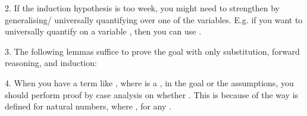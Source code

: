 \begin{isabellebody}
\begin{isamarkuptext}
  2. If the induction hypothesis is too week, you might need to strengthen by generalising/
     universally quantifying over one of the variables. E.g. if you want to universally quantify on
     a variable , then you can use .

  3. The following lemmas suffice to prove the goal with only substitution, forward reasoning, and
     induction:


  4. When you have a term like , where  is a , in the goal or the assumptions, you 
     should perform proof by case analysis on whether . This is because of the way \isa{{\isacharminus}{\kern0pt}} is
     defined for natural numbers, where , for any .%
\end{isamarkuptext}\isamarkuptrue%
%
\isadelimproof
%
\endisadelimproof
%
\isatagproof
\isanewline
%
\endisatagproof
{\isafoldproof}%
%
\isadelimproof
%
\endisadelimproof
%
\isadelimtheory
%
\endisadelimtheory
%
\isatagtheory
%
\endisatagtheory
{\isafoldtheory}%
%
\isadelimtheory
%
\endisadelimtheory
%
\end{isabellebody}%
\endinput
